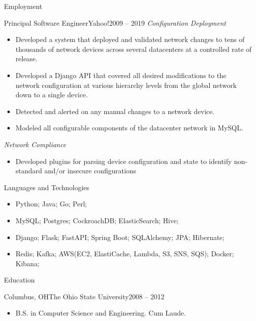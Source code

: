 \documentclass[calibri]{mcdowellcv}
\begin{document}
\begin{cvsection}{Employment}
		\begin{cvsubsection}{Principal Software Engineer}{Yahoo!}{2009 -- 2019}	
			\textit{Configuration Deployment}
			\begin{itemize}
				\item Developed a system that deployed and validated network changes to tens of thousands of network devices across several datacenters at a controlled rate of release.
				\item Developed a Django API that covered all desired modifications to the network configuration at various hierarchy levels from the global network down to a single device.
				\item Detected and alerted on any manual changes to a network device.
				\item Modeled all configurable components of the datacenter network in MySQL.
			\end{itemize}
			\bigskip
			\textit{Network Compliance}
			\begin{itemize}
				\item Developed plugins for parsing device configuration and state to identify non-standard and/or insecure configurations
			\end{itemize}
		\end{cvsubsection}
	\end{cvsection}
	
	\begin{cvsection}{Languages and Technologies}
		\begin{cvsubsection}{}{}{}	
			\begin{itemize}
				\item Python; Java; Go; Perl;
				\item MySQL; Postgres; CockroachDB; ElasticSearch; Hive; 
				\item Django; Flask; FastAPI; Spring Boot; SQLAlchemy; JPA; Hibernate;
				\item Redis; Kafka; AWS(EC2, ElastiCache, Lambda, S3, SNS, SQS); Docker; Kibana;
			\end{itemize}
		\end{cvsubsection}
	\end{cvsection}
	
	\begin{cvsection}{Education}
		\begin{cvsubsection}{Columbus, OH}{The Ohio State University}{2008 -- 2012}
			\begin{itemize}
				\item B.S. in Computer Science and Engineering. Cum Laude.
			\end{itemize}
		\end{cvsubsection}
	\end{cvsection}
\end{document}
